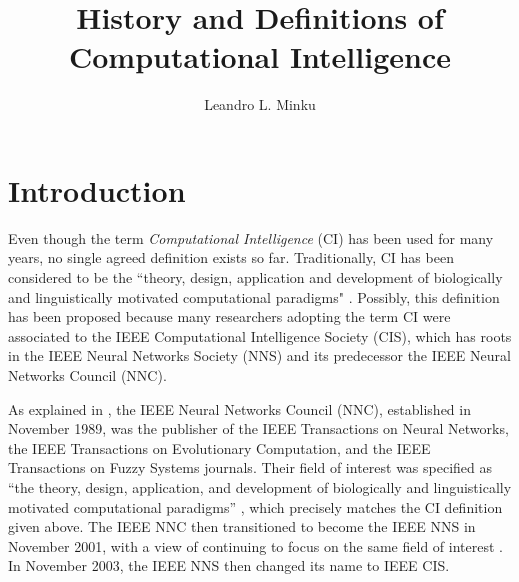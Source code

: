 \part{Introduction}
\thispagestyle{empty}

\title{History and Definitions of Computational Intelligence}
\author{Leandro L. Minku}
\maketitle
\label{chp:history}
\label{chp:definitions}


Even though the term \textit{Computational Intelligence} (CI) has been used for many years, no single agreed definition exists so far. Traditionally, CI has been considered to be the ``theory, design, application and development of biologically and linguistically motivated computational paradigms" \cite{ciswebsite}. Possibly, this definition has been proposed because many researchers adopting the term CI were associated to the IEEE Computational Intelligence Society (CIS), which has roots in the IEEE Neural Networks Society (NNS) and its predecessor the IEEE Neural Networks Council (NNC). 

As explained in \cite{cishistory}, the IEEE Neural Networks Council (NNC), established in November 1989, was the publisher of the IEEE Transactions on Neural Networks, the IEEE Transactions on Evolutionary Computation, and the IEEE Transactions on Fuzzy Systems journals. Their field of interest was specified as ``the theory, design, application, and development of biologically and linguistically motivated computational paradigms'' \cite{NNSEditorial}, which precisely matches the CI definition given above. The IEEE NNC then transitioned to become the IEEE NNS in November 2001, with a view of continuing to focus on the same field of interest \cite{NNSEditorial}. In November 2003, the IEEE NNS then changed its name to IEEE CIS. 

